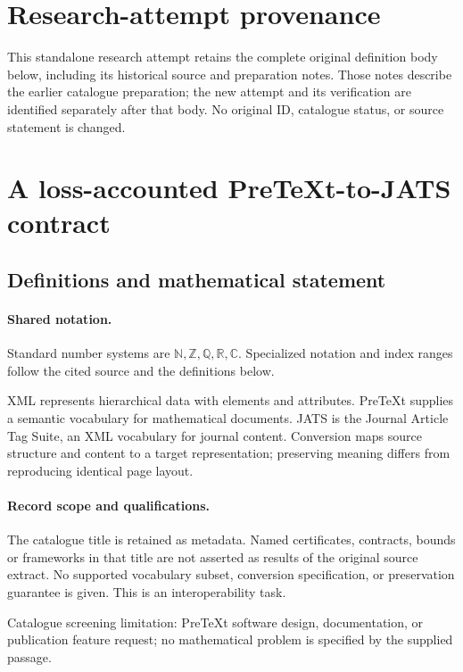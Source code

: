 \documentclass[11pt]{article}
\begin{document}
\section*{Research-attempt provenance}
This standalone research attempt retains the complete original definition body below,
including its historical source and preparation notes. Those notes describe the
earlier catalogue preparation; the new attempt and its verification are identified
separately after that body. No original ID, catalogue status, or source statement is changed.

\section{A loss-accounted PreTeXt-to-JATS contract}\label{statement}

\subsection{Definitions and mathematical statement}

\paragraph{Shared notation.}Standard number systems are $\mathbb N,\mathbb Z,\mathbb Q,\mathbb R,\mathbb C$. Specialized notation and index ranges follow the cited source and the definitions below.


XML represents hierarchical data with elements and attributes. PreTeXt supplies a semantic vocabulary for mathematical documents. JATS is the Journal Article Tag Suite, an XML vocabulary for journal content. Conversion maps source structure and content to a target representation; preserving meaning differs from reproducing identical page layout.
\paragraph{Record scope and qualifications.}
The catalogue title is retained as metadata. Named certificates, contracts, bounds or frameworks in that title are not asserted as results of the original source extract.
No supported vocabulary subset, conversion specification, or preservation guarantee is given. This is an interoperability task.

Catalogue screening limitation: PreTeXt software design, documentation, or publication feature request; no mathematical problem is specified by the supplied passage.
\end{document}
